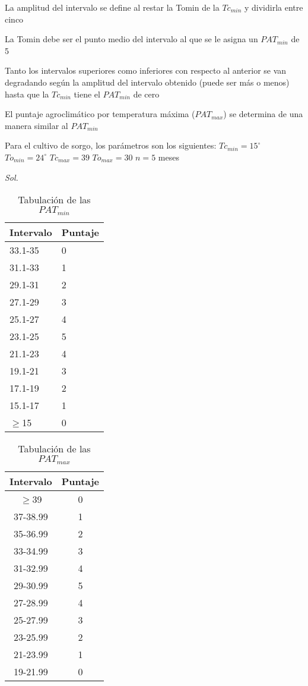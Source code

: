 La amplitud del intervalo se define al restar la Tomin de la $Tc_{min}$ y dividirla entre cinco

La Tomin debe ser el punto medio del intervalo al que se le asigna un $PAT_{min}$ de 5

Tanto los intervalos superiores como inferiores con respecto al anterior se van degradando según la amplitud del intervalo obtenido (puede ser más o menos) hasta que la $Tc_{min}$ tiene el $PAT_{min}$ de cero

El puntaje agroclimático por temperatura máxima ($PAT_{max}$) se determina de una manera similar al $PAT_{min}$ 

\begin{example}
    Para el cultivo de sorgo, los parámetros son los siguientes:
    $Tc_{min} = 15^{\circ}$ $To_{min} = 24^{\circ}$ $Tc_{max} = 39$ $To_{max} = 30$ $n = 5$ meses
\end{example}
\textit{ Sol. }
\begin{table}[h!]
    \centering
    \begin{tabular}{@{}ll@{}}
    \toprule
    Intervalo & Puntaje \\ \midrule
    33.1-35   & 0       \\
    31.1-33   & 1       \\
    29.1-31   & 2       \\
    27.1-29   & 3       \\
    25.1-27   & 4       \\
    23.1-25   & 5       \\
    21.1-23   & 4       \\
    19.1-21   & 3       \\
    17.1-19   & 2       \\
    15.1-17   & 1       \\
    $\geq$15  & 0       \\ \bottomrule
    \end{tabular}
    \caption{Tabulación de las $PAT_{min}$}
    \label{tabma18}
\end{table}
\begin{table}[h!]
    \centering
    \begin{tabular}{@{}cc@{}}
    \toprule
    Intervalo & Puntaje \\ \midrule
    $\geq$39  & 0       \\
    37-38.99  & 1       \\
    35-36.99  & 2       \\
    33-34.99  & 3       \\
    31-32.99  & 4       \\
    29-30.99  & 5       \\
    27-28.99  & 4       \\
    25-27.99  & 3       \\
    23-25.99  & 2       \\
    21-23.99  & 1       \\
    19-21.99  & 0       \\ \bottomrule
    \end{tabular}
    \caption{Tabulación de las $PAT_{max}$}
    \label{tabma19}
\end{table}
